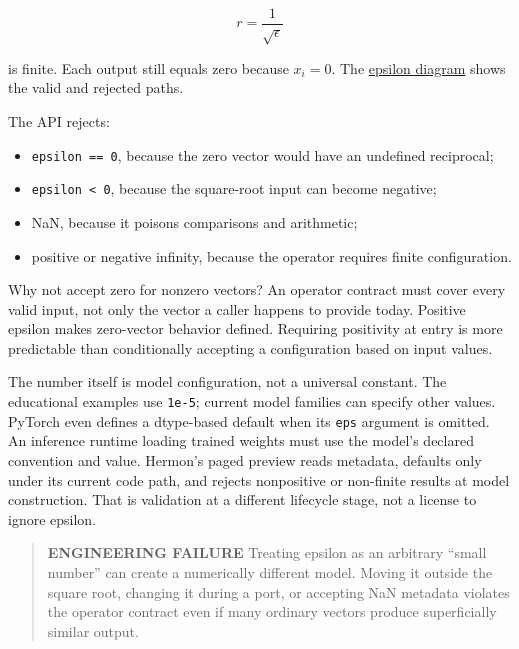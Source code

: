 \begin{equation}
r=\frac{1}{\sqrt{\epsilon}}
\end{equation}

is finite. Each output still equals zero because \(x_i=0\). The
\href{https://github.com/hermonai/inside-the-llm-engine/blob/astra-visual-rewrite/diagrams/transformer/epsilon-zero-vector.txt}{epsilon
diagram} shows the valid and rejected paths.

The  API rejects:

\begin{itemize}
\tightlist
\item
  \texttt{epsilon\ ==\ 0}, because the zero vector would have an
  undefined reciprocal;
\item
  \texttt{epsilon\ \textless{}\ 0}, because the square-root input can
  become negative;
\item
  NaN, because it poisons comparisons and arithmetic;
\item
  positive or negative infinity, because the operator requires finite
  configuration.
\end{itemize}

Why not accept zero for nonzero vectors? An operator contract must cover
every valid input, not only the vector a caller happens to provide
today. Positive epsilon makes zero-vector behavior defined. Requiring
positivity at entry is more predictable than conditionally accepting a
configuration based on input values.

The number itself is model configuration, not a universal constant. The
educational examples use \texttt{1e-5}; current model families can
specify other values. PyTorch even defines a dtype-based default when
its \texttt{eps} argument is omitted. An inference runtime loading
trained weights must use the model's declared convention and value.
Hermon's paged preview reads
\texttt{} metadata,
defaults only under its current code path, and rejects nonpositive or
non-finite results at model construction. That is validation at a
different lifecycle stage, not a license to ignore epsilon.

\begin{quote}
\textbf{ENGINEERING FAILURE} Treating epsilon as an arbitrary ``small
number'' can create a numerically different model. Moving it outside the
square root, changing it during a port, or accepting NaN metadata
violates the operator contract even if many ordinary vectors produce
superficially similar output.
\end{quote}

